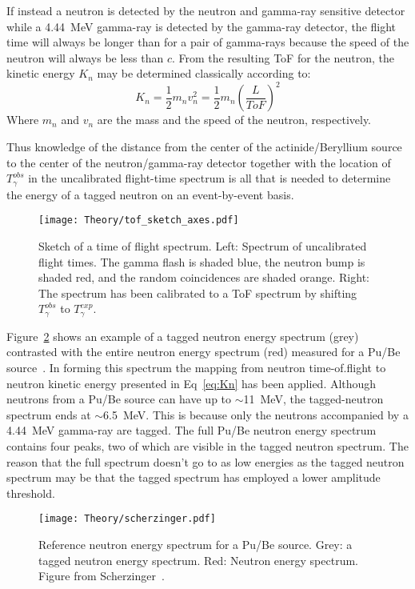 \documentclass[main.tex]{subfiles}
\begin{document}
If instead a neutron is detected by the neutron and gamma-ray sensitive detector while a \SI{4.44}{\MeV} gamma-ray is detected by the gamma-ray detector, the flight time will always be longer than for a pair of gamma-rays because the speed of the neutron will always be less than $c$. From the resulting ToF for the neutron, the kinetic energy $K_n$ may be determined classically according to:
\begin{equation}
	K_n = \frac{1}{2} m_n v_n^2 = \frac{1}{2}m_n\left(\frac{L}{ToF}\right)^2
	\label{eq:Kn}
\end{equation}
Where $m_n$ and $v_n$ are the mass and the speed of the neutron, respectively.

Thus knowledge of the distance from the center of the actinide/Beryllium source to the center of the neutron/gamma-ray detector together with the location of $T_\gamma^{obs}$ in the uncalibrated flight-time spectrum is all that is needed to determine the energy of a tagged neutron on an event-by-event basis.

\begin{figure}[t]
    \centering
        \texttt{[image: Theory/tof\_sketch\_axes.pdf]}
        \caption[Sketch of a time of flight spectrum.]{Sketch of a time of flight spectrum. Left: Spectrum of uncalibrated flight times. The gamma flash is shaded blue, the neutron bump is shaded red, and the random coincidences are shaded orange. Right: The spectrum has been calibrated to a ToF spectrum by shifting $T_\gamma^{obs}$ to $T_\gamma^{exp}.$}
    \label{fig:tof_sketch} 
\end{figure}
Figure~\ref{fig:scherzinger} shows an example of a tagged neutron energy spectrum (grey) contrasted with the entire neutron energy spectrum (red) measured for a Pu/Be source~\cite{ScherzingerPhd}. In forming this spectrum the mapping from neutron time-of.flight to neutron kinetic energy presented in Eq~\ref{eq:Kn} has been applied. Although neutrons from a Pu/Be source can have up to $\sim$\SI{11}{\MeV}, the tagged-neutron spectrum ends at $\sim$\SI{6.5}{\MeV}. This is because only the neutrons accompanied by a \SI{4.44}{\MeV} gamma-ray are tagged. The full Pu/Be neutron energy spectrum contains four peaks, two of which are visible in the tagged neutron spectrum. The reason that the full spectrum doesn't go to as low energies as the tagged neutron spectrum may be that the tagged spectrum has employed a lower amplitude threshold.
\begin{figure}[h]
    \centering
        \texttt{[image: Theory/scherzinger.pdf]}
        \caption[Reference neutron energy spectrum for a Pu/Be source.]{Reference neutron energy spectrum for a Pu/Be source. Grey: a tagged neutron energy spectrum. Red: Neutron energy spectrum. Figure from Scherzinger~\cite{ScherzingerPhd}.}
    \label{fig:scherzinger} 
\end{figure}
\end{document}
